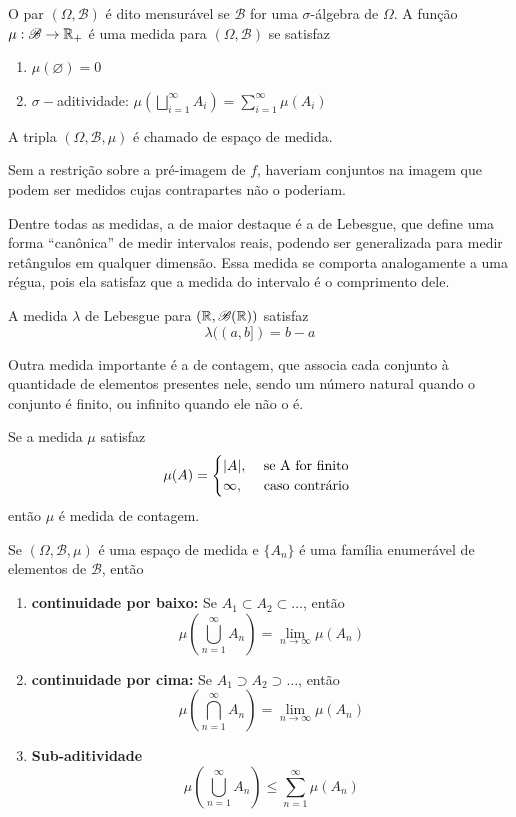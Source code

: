 \begin{def:mensuravel}
\label{def:mensuravel}
O par $(\Omega, \mathcal{B})$ é dito mensurável se $\mathcal{B}$ for uma $\sigma$-álgebra
de $\Omega$.
A função \(\mu: \mathcal{B} \to \mathbb{R}_+\) é uma medida para $(\Omega, \mathcal{B})$
se satisfaz
\begin{enumerate}
	\item[i.] $\mu(\varnothing) = 0$
	\item[ii. ] $\sigma-$aditividade: $\mu\left(\bigsqcup_{i = 1}^\infty A_i\right) = \sum_{i=1}^\infty \mu(A_i)$
\end{enumerate}
A tripla $(\Omega, \mathcal{B}, \mu)$ é chamado de espaço de medida.
\end{def:mensuravel}

Sem a restrição sobre a pré-imagem de $f$, haveriam conjuntos na imagem que podem ser
medidos cujas contrapartes não o poderiam.

Dentre todas as medidas, a de maior destaque é a de Lebesgue, que define uma forma
``canônica'' de medir intervalos reais, podendo ser generalizada para medir retângulos
em qualquer dimensão.
Essa medida se comporta analogamente a uma régua, pois ela satisfaz que a medida do
intervalo é o comprimento dele.

\begin{def:medida de lebesgue}
A medida $\lambda$ de Lebesgue para $(\mathbb{R}, \mathcal{B}(\mathbb{R}))$ satisfaz
\[
	\lambda((a, b]) = b - a
\]
\end{def:medida de lebesgue}

Outra medida importante é a de contagem, que associa cada conjunto à quantidade de
elementos presentes nele, sendo um número natural quando o conjunto é finito, ou infinito
quando ele não o é.

\begin{def:medida de contagem}
Se a medida $\mu$ satisfaz
\[
	\mu(A) = \begin{cases}
		|A|,      & \text{ se } $A$ \text{ for finito} \\
		\infty, & \text{ caso contrário }
	\end{cases}
\]
então $\mu$ é medida de contagem.
\end{def:medida de contagem}

\begin{thm:calculo medida}
Se $(\Omega, \mathcal{B}, \mu)$ é uma espaço de medida e $\{A_n\}$ é uma família
enumerável de elementos de $\mathcal{B}$, então
\begin{enumerate}
	\item[i.] \textbf{continuidade por baixo:} Se $A_1 \subset A_2 \subset \ldots$, então
	      \[
		      \mu\left(\bigcup_{n=1}^\infty A_n\right) = \lim_{n \to \infty} \mu(A_n)
	      \]
	\item[ii.] \textbf{continuidade por cima:} Se $A_1 \supset A_2 \supset \ldots$, então
	      \[
		      \mu\left(\bigcap_{n=1}^\infty A_n\right) = \lim_{n \to \infty} \mu(A_n)
	      \]
	\item[iii.] \textbf{Sub-aditividade}
	      \[
		      \mu\left(\bigcup_{n=1}^\infty A_n\right) \le \sum_{n=1}^\infty \mu(A_n)
	      \]
\end{enumerate}
\end{thm:calculo medida}

